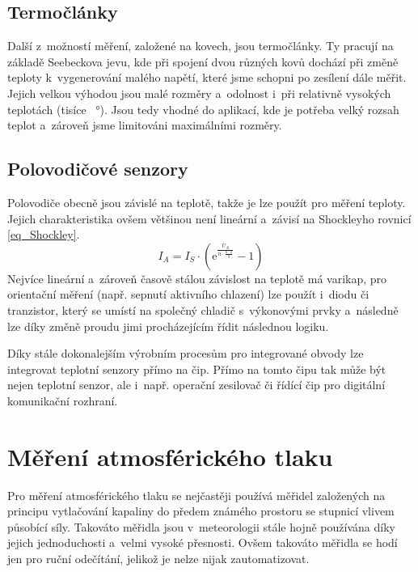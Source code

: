 \subsection{Termočlánky}

Další z~možností měření, založené na kovech, jsou termočlánky. Ty pracují na základě Seebeckova jevu, kde při spojení dvou různých kovů dochází při změně teploty k~vygenerování malého napětí, které jsme schopni po zesílení dále měřit. Jejich velkou výhodou jsou malé rozměry a~odolnost i~při relativně vysokých teplotách (tisíce \SI{}{\degree}). Jsou tedy vhodné do aplikací, kde je potřeba velký rozsah teplot a~zároveň jsme limitováni maximálními rozměry.

\subsection{Polovodičové senzory}

Polovodiče obecně jsou závislé na teplotě, takže je lze použít pro měření teploty. Jejich charakteristika ovšem většinou není lineární a~závisí na Shockleyho rovnicí \eqref{eq_Shockley}.
\begin{equation}
    I_A =I_S \cdot (\mathrm{e} ^{\frac{U_A}{n \cdot \frac{k \cdot T}{q}}} - 1)
    \label{eq_Shockley}
\end{equation}
Nejvíce lineární a~zároveň časově stálou závislost na teplotě má varikap, pro orientační měření (např. sepnutí aktivního chlazení) lze použít i~diodu či tranzistor, který se umístí na společný chladič s~výkonovými prvky a~následně lze díky změně proudu jimi procházejícím řídit následnou logiku.

Díky stále dokonalejším výrobním procesům pro integrované obvody lze integrovat teplotní senzory přímo na čip. Přímo na tomto čipu tak může být nejen teplotní senzor, ale i~např. operační zesilovač či řídící čip pro digitální komunikační rozhraní.

\section{Měření atmosférického tlaku}

Pro měření atmosférického tlaku se nejčastěji používá měřidel založených na principu vytlačování kapaliny do předem známého prostoru se stupnicí vlivem působící síly. Takováto měřidla jsou v~meteorologii stále hojně používána díky jejich jednoduchosti a~velmi vysoké přesnosti. Ovšem takováto měřidla se hodí jen pro ruční odečítání, jelikož je nelze nijak zautomatizovat.

